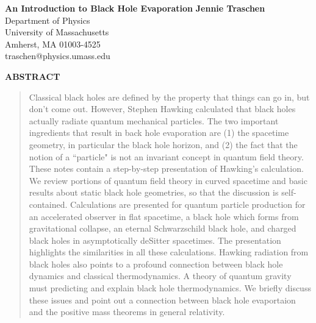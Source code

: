 \documentclass[12pt]{article}
\begin{document}
\begin{titlepage}
\vfill



\vfill

\begin{center}
\baselineskip=16pt
{\Large\bf An Introduction to Black Hole Evaporation}
\vskip 0.3cm
{\large {\sl }}
{\bf Jennie Traschen } \\
\vskip 1cm
{\small
  Department of Physics\\
  University of Massachusetts\\
  Amherst, MA 01003-4525\\
	 traschen@physics.umass.edu
}
\end{center}
\vfill
\par
\begin{center}
{\bf ABSTRACT}
\end{center}
\begin{quote}

Classical black holes are defined by the property that things can go in,
but don't
come out. However, Stephen Hawking calculated that black holes actually radiate
quantum mechanical particles. The two important ingredients that result in
back hole evaporation are (1) the spacetime geometry, in particular the
black hole horizon, and
(2) the fact that the notion of a ``particle" is not an invariant concept
in quantum field theory.
These notes contain a
step-by-step presentation of Hawking's calculation. We review portions of
quantum field theory in curved spacetime and basic results about static black
hole geometries, so that the discussion is self-contained.
Calculations are presented for quantum particle production for
an accelerated observer in flat spacetime, a black hole which forms from
gravitational collapse, an
eternal Schwarzschild black hole,  and charged black holes in asymptotically
deSitter spacetimes.  The presentation highlights the similarities in all
these calculations.
Hawking radiation from black holes also points to a profound connection
between black hole dynamics and classical thermodynamics.  A theory of
quantum gravity must predicting and
explain black hole thermodynamics.  We briefly discuss these issues
and point out a connection between black hole evaportaion and the positive mass
theorems in general relativity.

\vfill

\end{quote}
\end{titlepage}
\end{document}
